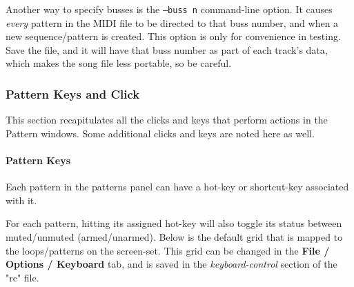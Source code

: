 

   Another way to specify busses is the
   \texttt{--buss n} command-line option.
   It causes \textsl{every} pattern in the MIDI
   file to be directed to that buss number, and when a new
   sequence/pattern is created.  This option is only
   for convenience in testing.  Save the file, and it will
   have that buss number as part of each track's data, which makes the song
   file less portable, so be careful.


\subsubsection{Pattern Keys and Click}
\label{subsubsec:patterns_pattern_keys_and_clicks}

   This section recapitulates all the clicks and keys that perform actions
   in the Pattern windows.  Some additional clicks and keys are noted here
   as well.

\paragraph{Pattern Keys}
\label{paragraph:patterns_pattern_keys}

   Each pattern in the patterns panel can have a hot-key or shortcut-key
   associated with it.

   For each pattern, hitting its assigned hot-key will
   also toggle its status between muted/unmuted (armed/unarmed).
   Below is the default grid that is
   mapped to the loops/patterns on the screen-set.
   This grid can be changed in the
   \textbf{File / Options / Keyboard} tab, and is
   saved in the \textsl{keyboard-control} section of the
   "rc" file.

